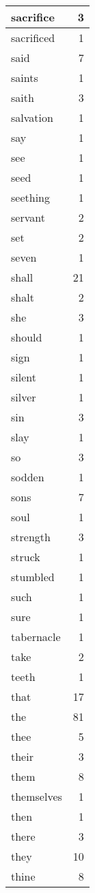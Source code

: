 \begin{center}
\begin{longtable}{l|r}
sacrifice & 3 \\ \hline
sacrificed & 1 \\ \hline
said & 7 \\ \hline
saints & 1 \\ \hline
saith & 3 \\ \hline
salvation & 1 \\ \hline
say & 1 \\ \hline
see & 1 \\ \hline
seed & 1 \\ \hline
seething & 1 \\ \hline
servant & 2 \\ \hline
set & 2 \\ \hline
seven & 1 \\ \hline
shall & 21 \\ \hline
shalt & 2 \\ \hline
she & 3 \\ \hline
should & 1 \\ \hline
sign & 1 \\ \hline
silent & 1 \\ \hline
silver & 1 \\ \hline
sin & 3 \\ \hline
slay & 1 \\ \hline
so & 3 \\ \hline
sodden & 1 \\ \hline
sons & 7 \\ \hline
soul & 1 \\ \hline
strength & 3 \\ \hline
struck & 1 \\ \hline
stumbled & 1 \\ \hline
such & 1 \\ \hline
sure & 1 \\ \hline
tabernacle & 1 \\ \hline
take & 2 \\ \hline
teeth & 1 \\ \hline
that & 17 \\ \hline
the & 81 \\ \hline
thee & 5 \\ \hline
their & 3 \\ \hline
them & 8 \\ \hline
themselves & 1 \\ \hline
then & 1 \\ \hline
there & 3 \\ \hline
they & 10 \\ \hline
thine & 8 \\ \hline

\end{longtable}
\end{center}
